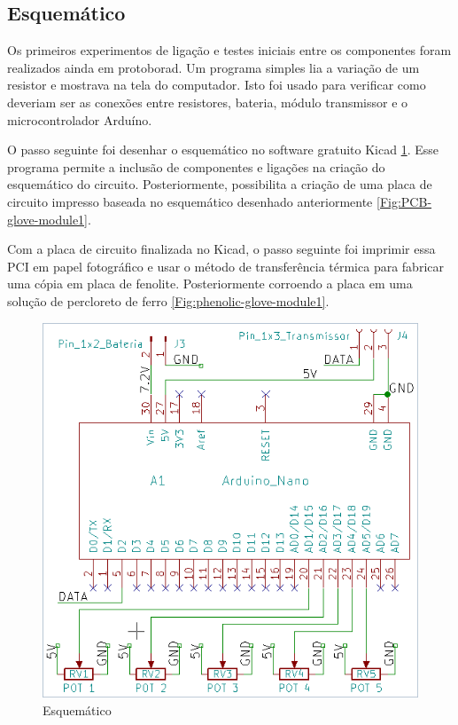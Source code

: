 \documentclass[
	12pt,				%
	openright,			%
	oneside,			%
	a4paper,			%
	english,			%
	brazil				%
	]{abntex2}
\begin{document}
			\subsection{Esquemático}

			Os primeiros experimentos de ligação e testes iniciais entre os componentes foram realizados ainda em protoborad. Um programa simples lia a variação de um resistor e mostrava na tela do computador. Isto foi usado para verificar como deveriam ser as conexões entre resistores, bateria, módulo transmissor e o microcontrolador Arduíno.

			O passo seguinte foi desenhar o esquemático no software gratuito Kicad \ref{Fig:schematic-glove-module1}. Esse programa permite a inclusão de componentes e ligações na criação do esquemático do circuito. Posteriormente, possibilita a criação de uma placa de circuito impresso baseada no esquemático desenhado anteriormente  \ref{Fig:PCB-glove-module1}.

			Com a placa de circuito finalizada no Kicad, o passo seguinte foi imprimir essa PCI em papel fotográfico e usar o método de transferência térmica para fabricar uma cópia em placa de fenolite. Posteriormente corroendo a placa em uma solução de percloreto de ferro \ref{Fig:phenolic-glove-module1}.

		\begin{figure}[h!]
			\centering
  		\includegraphics[scale=0.5]{./figures/schematic-glove-module1.png}
			\caption{Esquemático}
  		\label{Fig:schematic-glove-module1}
		\end{figure}
\end{document}
